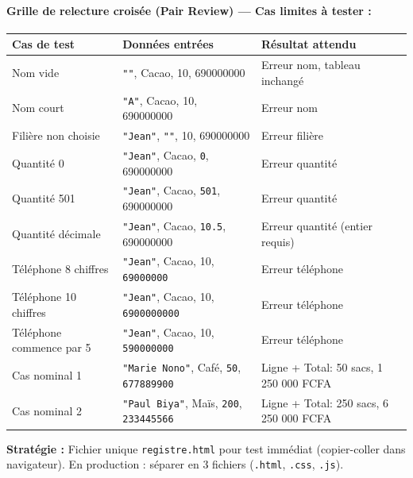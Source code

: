 \documentclass[11pt]{article}
\begin{document}
\begin{experience}
\paragraph{Grille de relecture croisée (Pair Review) — Cas limites à tester :}
\begin{center}
\begin{tabularx}{\linewidth}{|l|X|X|}\hline
\textbf{Cas de test} & \textbf{Données entrées} & \textbf{Résultat attendu} \\\hline
Nom vide & \texttt{""}, Cacao, 10, 690000000 & Erreur nom, tableau inchangé \\\hline
Nom court & \texttt{"A"}, Cacao, 10, 690000000 & Erreur nom \\\hline
Filière non choisie & \texttt{"Jean"}, \texttt{""}, 10, 690000000 & Erreur filière \\\hline
Quantité 0 & \texttt{"Jean"}, Cacao, \texttt{0}, 690000000 & Erreur quantité \\\hline
Quantité 501 & \texttt{"Jean"}, Cacao, \texttt{501}, 690000000 & Erreur quantité \\\hline
Quantité décimale & \texttt{"Jean"}, Cacao, \texttt{10.5}, 690000000 & Erreur quantité (entier requis) \\\hline
Téléphone 8 chiffres & \texttt{"Jean"}, Cacao, 10, \texttt{69000000} & Erreur téléphone \\\hline
Téléphone 10 chiffres & \texttt{"Jean"}, Cacao, 10, \texttt{6900000000} & Erreur téléphone \\\hline
Téléphone commence par 5 & \texttt{"Jean"}, Cacao, 10, \texttt{590000000} & Erreur téléphone \\\hline
Cas nominal 1 & \texttt{"Marie Nono"}, Café, \texttt{50}, \texttt{677889900} & Ligne + Total: 50 sacs, 1 250 000 FCFA \\\hline
Cas nominal 2 & \texttt{"Paul Biya"}, Maïs, \texttt{200}, \texttt{233445566} & Ligne + Total: 250 sacs, 6 250 000 FCFA \\\hline
\end{tabularx}
\end{center}
\end{experience}

\begin{exemplebox}
\textbf{Stratégie :} Fichier unique \texttt{registre.html} pour test immédiat (copier-coller dans navigateur). En production : séparer en 3 fichiers (\texttt{.html}, \texttt{.css}, \texttt{.js}).
\end{exemplebox}
\end{document}
